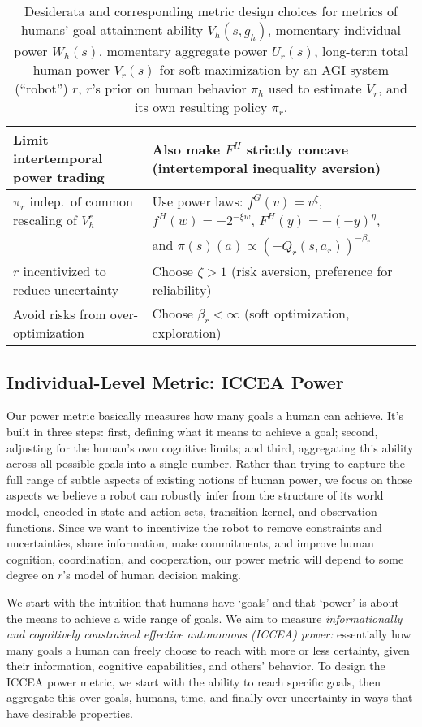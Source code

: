 \documentclass[letterpaper]{article} %
\begin{document}
\begin{table*}[]
\begin{tabular}{ll}
       Limit intertemporal power trading & Also make $F^H$ strictly concave (intertemporal inequality aversion) \\ 
       \midrule
       $\pi_r$ indep.~of common rescaling of $V^e_h$ & Use power laws: $f^G(v)=v^\zeta$, $f^H(w)=-2^{-\xi w}$, $F^H(y)=-(-y)^\eta$, \\
       & and $\pi(s)(a)\propto (-Q_r(s,a_r))^{-\beta_r}$ \\
       $r$ incentivized to reduce uncertainty & Choose $\zeta>1$ (risk aversion, preference for reliability) \\
       Avoid risks from over-optimization & Choose $\beta_r<\infty$ (soft optimization, exploration) \\
       \bottomrule
    \end{tabular}
    \caption{Desiderata and corresponding metric design choices for metrics of humans' goal-attainment ability $V_h(s,g_h)$, momentary individual power $W_h(s)$, momentary aggregate power $U_r(s)$, long-term total human power $V_r(s)$ for soft maximization by an AGI system (``robot'') $r$, $r$'s prior on human behavior $\pi_h$ used to estimate $V_r$,
    and its own resulting policy $\pi_r$.}
    \label{tab:desiderata}
\end{table*}


\subsection{Individual-Level Metric: ICCEA Power}

Our power metric basically measures how many goals a human can achieve. It's built in three steps: first, defining what it means to achieve a goal; second, adjusting for the human's own cognitive limits; and third, aggregating this ability across all possible goals into a single number.
Rather than trying to capture the full range of subtle aspects of existing notions of human power, we focus on those aspects we believe a robot can robustly infer from the structure of its world model, encoded in state and action sets, transition kernel, and observation functions.
Since we want to incentivize the robot to remove constraints and uncertainties, share information, make commitments, and improve human cognition, coordination, and cooperation, our power metric will depend to some degree on $r$'s model of human decision making.

We start with the intuition that humans have `goals' and that `power' is about the means to achieve a wide range of goals.
We aim to measure {\em informationally and cognitively constrained effective autonomous (ICCEA) power:} 
essentially how many goals a human can freely choose to reach with more or less certainty, given their information, cognitive capabilities, and others' behavior.
To design the ICCEA power metric, we start with the ability to reach specific goals, then aggregate this over goals, humans, time, and finally over uncertainty in ways that have desirable properties.
\end{document}
